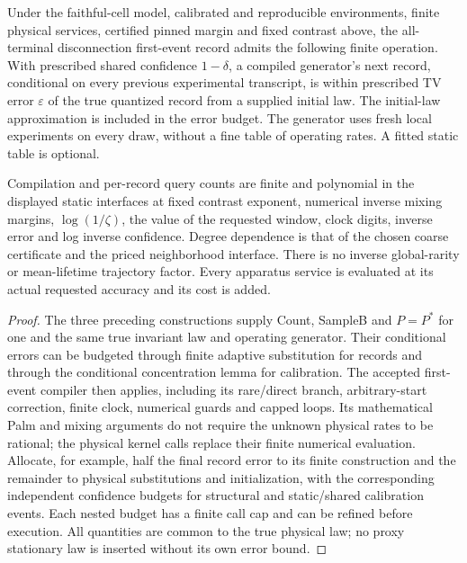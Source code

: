 \begin{theorem}
Under the faithful-cell model, calibrated and reproducible environments,
finite physical services, certified pinned margin and fixed contrast
above, the all-terminal disconnection first-event record admits the
following finite operation. With prescribed shared confidence
$1-\delta$, a compiled generator's next record, conditional on every
previous experimental transcript, is within prescribed TV error
$\varepsilon$ of the true quantized record from a supplied initial law.
The initial-law approximation is included in the error budget. The
generator uses fresh local experiments on every draw, without a fine
table of operating rates. A fitted static table is optional.

Compilation and per-record query counts are finite and polynomial in
the displayed static interfaces at fixed contrast exponent, numerical
inverse mixing margins, $\log(1/\zeta)$, the value of the requested
window, clock digits, inverse error and log inverse confidence.
Degree dependence is that of the chosen coarse certificate and the
priced neighborhood interface. There is no inverse global-rarity or
mean-lifetime trajectory factor. Every apparatus service is evaluated
at its actual requested accuracy and its cost is added.
\end{theorem}
\begin{proof}
The three preceding constructions supply Count, SampleB and $P=P^*$
for one and the same true invariant law and operating generator.
Their conditional errors can be budgeted through finite adaptive
substitution for records and through the conditional concentration
lemma for calibration. The accepted first-event compiler then applies,
including its rare/direct branch, arbitrary-start correction, finite
clock, numerical guards and capped loops. Its mathematical Palm and
mixing arguments do not require the unknown physical rates to be
rational; the physical kernel calls replace their finite numerical
evaluation. Allocate, for example, half the final record error to its
finite construction and the remainder to physical substitutions and
initialization, with the corresponding independent confidence budgets
for structural and static/shared calibration events. Each nested
budget has a finite call cap and can be refined before execution.
All quantities are common to the true physical law; no proxy stationary
law is inserted without its own error bound.
\end{proof}

